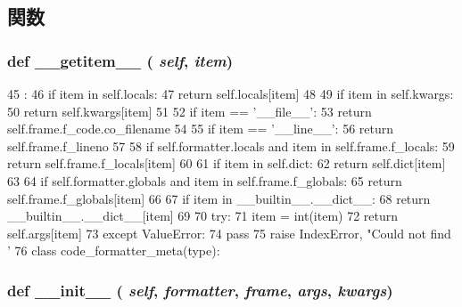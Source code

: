 \subsection{関数}
\hypertarget{classm5_1_1util_1_1code__formatter_1_1lookup_a50d766f4276c3d8fe330ac8cd344a75f}{
\subsubsection[{\_\-\_\-getitem\_\-\_\-}]{\setlength{\rightskip}{0pt plus 5cm}def \_\-\_\-getitem\_\-\_\- ( {\em self}, \/   {\em item})}}
\label{classm5_1_1util_1_1code__formatter_1_1lookup_a50d766f4276c3d8fe330ac8cd344a75f}



\begin{DoxyCode}
45                                :
46         if item in self.locals:
47             return self.locals[item]
48 
49         if item in self.kwargs:
50             return self.kwargs[item]
51 
52         if item == '__file__':
53             return self.frame.f_code.co_filename
54 
55         if item == '__line__':
56             return self.frame.f_lineno
57 
58         if self.formatter.locals and item in self.frame.f_locals:
59             return self.frame.f_locals[item]
60 
61         if item in self.dict:
62             return self.dict[item]
63 
64         if self.formatter.globals and item in self.frame.f_globals:
65             return self.frame.f_globals[item]
66 
67         if item in __builtin__.__dict__:
68             return __builtin__.__dict__[item]
69 
70         try:
71             item = int(item)
72             return self.args[item]
73         except ValueError:
74             pass
75         raise IndexError, "Could not find '%
76 
class code_formatter_meta(type):
\end{DoxyCode}
\hypertarget{classm5_1_1util_1_1code__formatter_1_1lookup_ac775ee34451fdfa742b318538164070e}{
\subsubsection[{\_\-\_\-init\_\-\_\-}]{\setlength{\rightskip}{0pt plus 5cm}def \_\-\_\-init\_\-\_\- ( {\em self}, \/   {\em formatter}, \/   {\em frame}, \/   {\em args}, \/   {\em kwargs})}}
\label{classm5_1_1util_1_1code__formatter_1_1lookup_ac775ee34451fdfa742b318538164070e}



